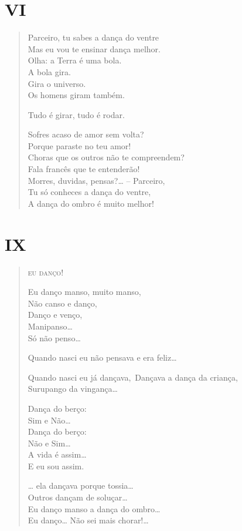 \pagebreak
\section*{VI}

\begin{verse}
Parceiro, tu sabes a dança do ventre\\
Mas eu vou te ensinar dança melhor.\\
Olha: a Terra é uma bola.\\
\qquad\qquad\quad\quad A bola gira.\\
\qquad\qquad Gira o universo.\\
\qquad Os homens giram também.

Tudo é girar, tudo é rodar.

\quad Sofres acaso de amor sem volta?\\
\quad Porque paraste no teu amor!\\
\qquad\quad Choras que os outros não te compreendem?\\
\qquad\quad Fala francês que te entenderão!\\
\qquad\qquad\quad Morres, duvidas, pensas?\ldots{} -- Parceiro,\\
Tu só conheces a dança do ventre,\\
A dança do ombro é muito melhor!
\end{verse}

\pagebreak
\section*{IX}

\begin{verse}
\textsc{eu danço!}

Eu danço manso, muito manso,\\
Não canso e danço,\\
Danço e venço,\\
\qquad Manipanso\ldots{}\\
\qquad\quad Só não penso\ldots{}

Quando nasci eu não pensava e era feliz\ldots{}

Quando nasci eu já dançava,\
Dançava a dança da criança,\\
\qquad Surupango da vingança\ldots{}

Dança do berço:\\
\qquad Sim e Não\ldots{}\\
Dança do berço:\\
\qquad Não e Sim\ldots{}\\
\qquad\quad A vida é assim\ldots{}\\
E eu sou assim.

\ldots{} ela dançava porque tossia\ldots{}\\
\qquad Outros dançam de soluçar\ldots{}\\
\qquad\quad Eu danço manso a dança do ombro\ldots{}\\
\qquad\qquad\quad Eu danço\ldots{} Não sei mais chorar!\ldots{}
\end{verse}

